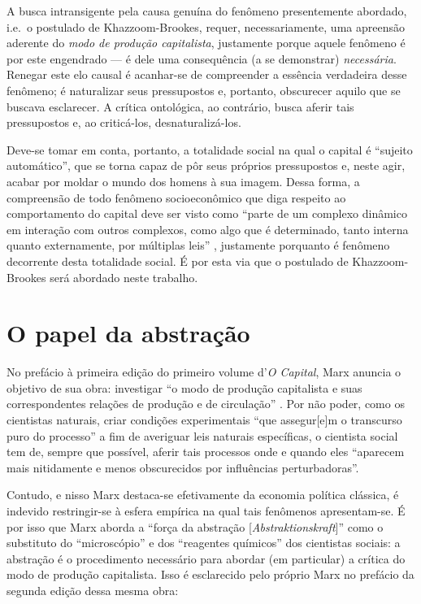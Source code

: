 A busca intransigente pela causa genuína do fenômeno presentemente abordado, i.e.~o postulado de Khazzoom-Brookes, requer, necessariamente, uma apreensão aderente do \textit{modo de produção capitalista}, justamente porque aquele fenômeno é por este engendrado --- é dele uma consequência (a se demonstrar) \emph{necessária}. Renegar este elo causal é acanhar-se de compreender a essência verdadeira desse fenômeno; é naturalizar seus pressupostos e, portanto, obscurecer aquilo que se buscava esclarecer. A crítica ontológica, ao contrário, busca aferir tais pressupostos e, ao criticá-los, desnaturalizá-los.

Deve-se tomar em conta, portanto, a totalidade social na qual o capital é ``sujeito automático'', que se torna capaz de pôr seus próprios pressupostos e, neste agir, acabar por moldar o mundo dos homens à sua imagem. Dessa forma, a compreensão de todo fenômeno socioeconômico que diga respeito ao comportamento do capital deve ser visto como ``parte de um complexo dinâmico em interação com outros complexos, como algo que é determinado, tanto interna quanto externamente, por múltiplas leis'' \parencite[p. 338]{Lukacs2012}, justamente porquanto é fenômeno decorrente desta totalidade social. É por esta via que o postulado de Khazzoom-Brookes será abordado neste trabalho.

\hypertarget{o-papel-da-abstrauxe7uxe3o}{%
\section{O papel da abstração}\label{o-papel-da-abstrauxe7uxe3o}}

No prefácio à primeira edição do primeiro volume d'\emph{O Capital}, Marx anuncia o objetivo de sua obra: investigar ``o modo de produção capitalista e suas correspondentes relações de produção e de circulação'' \parencite[p. 78]{Marx2017}. Por não poder, como os cientistas naturais, criar condições experimentais ``que assegur{[}e{]}m o transcurso puro do processo'' a fim de averiguar leis naturais específicas, o cientista social tem de, sempre que possível, aferir tais processos onde e quando eles ``aparecem mais nitidamente e menos obscurecidos por influências perturbadoras''.

Contudo, e nisso Marx destaca-se efetivamente da economia política clássica, é indevido restringir-se à esfera empírica na qual tais fenômenos apresentam-se. É por isso que Marx aborda a ``força da abstração {[}\emph{Abstraktionskraft}{]}'' como o substituto do ``microscópio'' e dos ``reagentes químicos'' dos cientistas sociais: a abstração é o procedimento necessário para abordar (em particular) a crítica do modo de produção capitalista. Isso é esclarecido pelo próprio Marx no prefácio da segunda edição dessa mesma obra:

